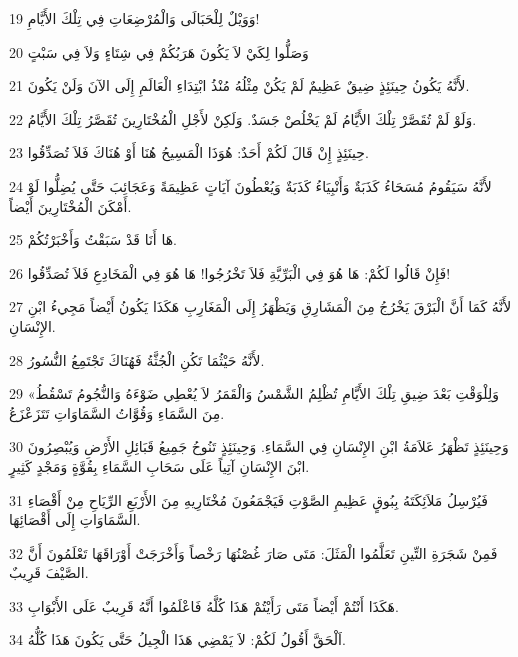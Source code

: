 \par 19 وَوَيْلٌ لِلْحَبَالَى وَالْمُرْضِعَاتِ فِي تِلْكَ الأَيَّامِ!
\par 20 وَصَلُّوا لِكَيْ لاَ يَكُونَ هَرَبُكُمْ فِي شِتَاءٍ وَلاَ فِي سَبْتٍ
\par 21 لأَنَّهُ يَكُونُ حِينَئِذٍ ضِيقٌ عَظِيمٌ لَمْ يَكُنْ مِثْلُهُ مُنْذُ ابْتِدَاءِ الْعَالَمِ إِلَى الآنَ وَلَنْ يَكُونَ.
\par 22 وَلَوْ لَمْ تُقَصَّرْ تِلْكَ الأَيَّامُ لَمْ يَخْلُصْ جَسَدٌ. وَلَكِنْ لأَجْلِ الْمُخْتَارِينَ تُقَصَّرُ تِلْكَ الأَيَّامُ.
\par 23 حِينَئِذٍ إِنْ قَالَ لَكُمْ أَحَدٌ: هُوَذَا الْمَسِيحُ هُنَا أَوْ هُنَاكَ فَلاَ تُصَدِّقُوا.
\par 24 لأَنَّهُ سَيَقُومُ مُسَحَاءُ كَذَبَةٌ وَأَنْبِيَاءُ كَذَبَةٌ وَيُعْطُونَ آيَاتٍ عَظِيمَةً وَعَجَائِبَ حَتَّى يُضِلُّوا لَوْ أَمْكَنَ الْمُخْتَارِينَ أَيْضاً.
\par 25 هَا أَنَا قَدْ سَبَقْتُ وَأَخْبَرْتُكُمْ.
\par 26 فَإِنْ قَالُوا لَكُمْ: هَا هُوَ فِي الْبَرِّيَّةِ فَلاَ تَخْرُجُوا! هَا هُوَ فِي الْمَخَادِعِ فَلاَ تُصَدِّقُوا!
\par 27 لأَنَّهُ كَمَا أَنَّ الْبَرْقَ يَخْرُجُ مِنَ الْمَشَارِقِ وَيَظْهَرُ إِلَى الْمَغَارِبِ هَكَذَا يَكُونُ أَيْضاً مَجِيءُ ابْنِ الإِنْسَانِ.
\par 28 لأَنَّهُ حَيْثُمَا تَكُنِ الْجُثَّةُ فَهُنَاكَ تَجْتَمِعُ النُّسُورُ.
\par 29 «وَلِلْوَقْتِ بَعْدَ ضِيقِ تِلْكَ الأَيَّامِ تُظْلِمُ الشَّمْسُ وَالْقَمَرُ لاَ يُعْطِي ضَوْءَهُ وَالنُّجُومُ تَسْقُطُ مِنَ السَّمَاءِ وَقُوَّاتُ السَّمَاوَاتِ تَتَزَعْزَعُ.
\par 30 وَحِينَئِذٍ تَظْهَرُ عَلاَمَةُ ابْنِ الإِنْسَانِ فِي السَّمَاءِ. وَحِينَئِذٍ تَنُوحُ جَمِيعُ قَبَائِلِ الأَرْضِ وَيُبْصِرُونَ ابْنَ الإِنْسَانِ آتِياً عَلَى سَحَابِ السَّمَاءِ بِقُوَّةٍ وَمَجْدٍ كَثِيرٍ.
\par 31 فَيُرْسِلُ مَلاَئِكَتَهُ بِبُوقٍ عَظِيمِ الصَّوْتِ فَيَجْمَعُونَ مُخْتَارِيهِ مِنَ الأَرْبَعِ الرِّيَاحِ مِنْ أَقْصَاءِ السَّمَاوَاتِ إِلَى أَقْصَائِهَا.
\par 32 فَمِنْ شَجَرَةِ التِّينِ تَعَلَّمُوا الْمَثَلَ: مَتَى صَارَ غُصْنُهَا رَخْصاً وَأَخْرَجَتْ أَوْرَاقَهَا تَعْلَمُونَ أَنَّ الصَّيْفَ قَرِيبٌ.
\par 33 هَكَذَا أَنْتُمْ أَيْضاً مَتَى رَأَيْتُمْ هَذَا كُلَّهُ فَاعْلَمُوا أَنَّهُ قَرِيبٌ عَلَى الأَبْوَابِ.
\par 34 اَلْحَقَّ أَقُولُ لَكُمْ: لاَ يَمْضِي هَذَا الْجِيلُ حَتَّى يَكُونَ هَذَا كُلُّهُ.
